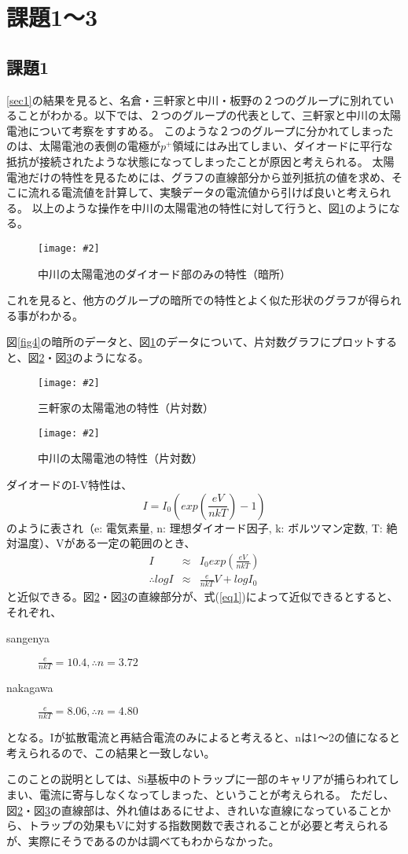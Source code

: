 \documentclass[11pt]{ltjsarticle}
\newcommand{\fig}[3]{
	\begin{figure}
		\texttt{[image: \#2]}
		\caption{#3}
		\label{#1}
	\end{figure}
}
\newcommand{\fr}[1]{図\ref{#1}}
\begin{document}
\section{課題1〜3}
	\subsection{課題1}
		\ref{sec1}の結果を見ると、名倉・三軒家と中川・板野の２つのグループに別れていることがわかる。以下では、２つのグループの代表として、三軒家と中川の太陽電池について考察をすすめる。
		このような２つのグループに分かれてしまったのは、太陽電池の表側の電極が$p^+$領域にはみ出てしまい、ダイオードに平行な抵抗が接続されたような状態になってしまったことが原因と考えられる。
		太陽電池だけの特性を見るためには、グラフの直線部分から並列抵抗の値を求め、そこに流れる電流値を計算して、実験データの電流値から引けば良いと考えられる。
		以上のような操作を中川の太陽電池の特性に対して行うと、\fr{fig9}のようになる。
		\fig{fig9}{resources/solar/diff/nakagawa.png}{中川の太陽電池のダイオード部のみの特性（暗所）}
		これを見ると、他方のグループの暗所での特性とよく似た形状のグラフが得られる事がわかる。
		
		\fr{fig4}の暗所のデータと、\fr{fig9}のデータについて、片対数グラフにプロットすると、\fr{fig10}・\fr{fig11}のようになる。
		\fig{fig10}{resources/solar/logscale/sangenya.png}{三軒家の太陽電池の特性（片対数）}
		\fig{fig11}{resources/solar/logscale/nakagawa.png}{中川の太陽電池の特性（片対数）}
		
		ダイオードのI-V特性は、
		\[
			I = I_0 \left( exp(\frac{eV}{nkT}) - 1 \right)
		\]
		のように表され（e: 電気素量, n: 理想ダイオード因子, k: ボルツマン定数, T: 絶対温度）、Vがある一定の範囲のとき、
		\begin{eqnarray}
			I & \approx & I_0 exp(\frac{eV}{nkT}) \nonumber \\
			\therefore log I & \approx & \frac{e}{nkT}V + log I_0 \label{eq1}
		\end{eqnarray}
		と近似できる。\fr{fig10}・\fr{fig11}の直線部分が、式(\ref{eq1})によって近似できるとすると、それぞれ、
		\begin{description}
			\item[sangenya] $ \frac{e}{nkT} = 10.4, \therefore n = 3.72 $
			\item[nakagawa] $ \frac{e}{nkT} = 8.06, \therefore n = 4.80 $
		\end{description}
		となる。Iが拡散電流と再結合電流のみによると考えると、nは1〜2の値になると考えられるので、この結果と一致しない。
		
		このことの説明としては、Si基板中のトラップに一部のキャリアが捕らわれてしまい、電流に寄与しなくなってしまった、ということが考えられる。
		ただし、\fr{fig10}・\fr{fig11}の直線部は、外れ値はあるにせよ、きれいな直線になっていることから、トラップの効果もVに対する指数関数で表されることが必要と考えられるが、実際にそうであるのかは調べてもわからなかった。
		
\end{document}
